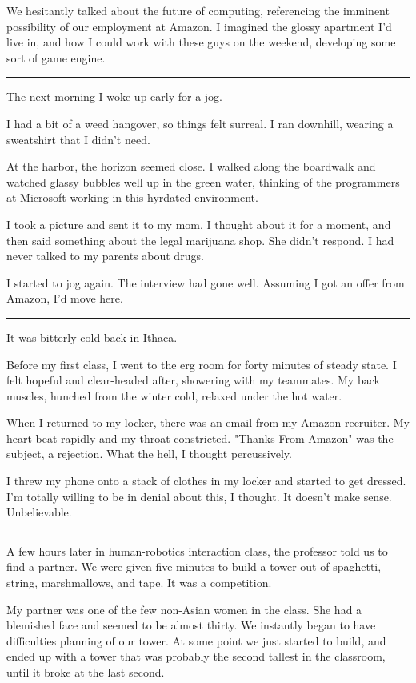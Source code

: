 We hesitantly talked about the future of computing, referencing the imminent
possibility of our employment at Amazon.  I imagined the glossy apartment I'd
live in, and how I could work with these guys on the weekend, developing some
sort of game engine.

\plainfancybreak{12pt}{2}{* * *}

The next morning I woke up early for a jog.

I had a bit of a weed hangover, so things felt surreal.  I ran downhill, wearing
a sweatshirt that I didn't need.

At the harbor, the horizon seemed close.  I walked along the boardwalk and
watched glassy bubbles well up in the green water, thinking of the programmers
at Microsoft working in this hyrdated environment.

I took a picture and sent it to my mom.  I thought about it for a moment, and
then said something about the legal marijuana shop.  She didn't respond.  I had
never talked to my parents about drugs.

I started to jog again.  The interview had gone well.  Assuming I got an offer
from Amazon, I'd move here. 

\plainfancybreak{12pt}{2}{* * *}

It was bitterly cold back in Ithaca.

Before my first class, I went to the erg room for forty minutes of steady state.
I felt hopeful and clear-headed after, showering with my teammates.  My back
muscles, hunched from the winter cold, relaxed under the hot water.

When I returned to my locker, there was an email from my Amazon recruiter.  My
heart beat rapidly and my throat constricted.  "Thanks From Amazon" was the
subject, a rejection.  What the hell, I thought percussively. 

I threw my phone onto a stack of clothes in my locker and started to get
dressed.  I'm totally willing to be in denial about this, I thought.  It doesn't
make sense.  Unbelievable. 

\plainfancybreak{12pt}{2}{* * *}

A few hours later in human-robotics interaction class, the professor told us to
find a partner.  We were given five minutes to build a tower out of spaghetti,
string, marshmallows, and tape.  It was a competition.

My partner was one of the few non-Asian women in the class.  She had a blemished
face and seemed to be almost thirty.  We instantly began to have difficulties
planning of our tower.  At some point we just started to build, and ended up
with a tower that was probably the second tallest in the classroom, until it
broke at the last second.

